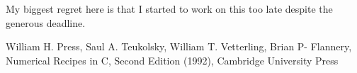 \documentclass[12pt, letterpaper]{article}
\begin{document}
My biggest regret here is that I started to work on this too late despite the generous deadline.

\begin{thebibliography}{9}
William H. Press, Saul A. Teukolsky, William T. Vetterling, Brian P- Flannery, Numerical Recipes in C, Second Edition (1992), Cambridge University Press
\end{thebibliography}
\end{document}
